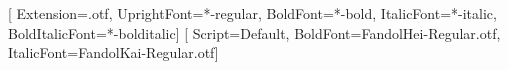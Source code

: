 \RequirePackage{fontspec}
\RequirePackage{xeCJK}
\setmainfont{texgyretermes}[
  Extension=.otf, UprightFont=*-regular, BoldFont=*-bold,
  ItalicFont=*-italic, BoldItalicFont=*-bolditalic]
[
  Script=Default, BoldFont=FandolHei-Regular.otf, ItalicFont=FandolKai-Regular.otf]
